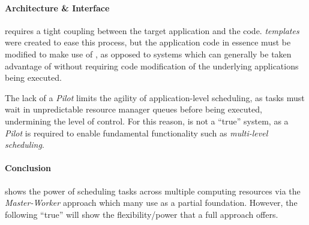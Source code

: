 \documentclass{sig-alternate}
\begin{document}
\paragraph{Architecture \& Interface}
\apples requires a tight coupling between the target application
and the \apples code.  \textit{\apples templates} were created
to ease this process, but the application code in essence must
be modified to make use of \apples, as opposed to \pilotjob
systems which can generally be taken advantage of without
requiring code modification of the underlying applications being
executed.

The lack of a \textit{Pilot} limits the agility
of application-level scheduling, as tasks
must wait in unpredictable resource manager queues before being executed,
undermining the level of control.  For this reason, \apples
is not a ``true'' \pilotjob system, as a \textit{Pilot}
is required to enable fundamental \pilotjob functionality such as
\textit{multi-level scheduling}.

\paragraph{\apples Conclusion}
\apples shows the power of scheduling tasks across multiple computing resources
via the \textit{Master-Worker} approach which many
\pilotjobs use as a partial foundation.  However,
the following ``true'' \pilotjobs will show the flexibility/power
that a full \pilotjob approach offers.




\end{document}
